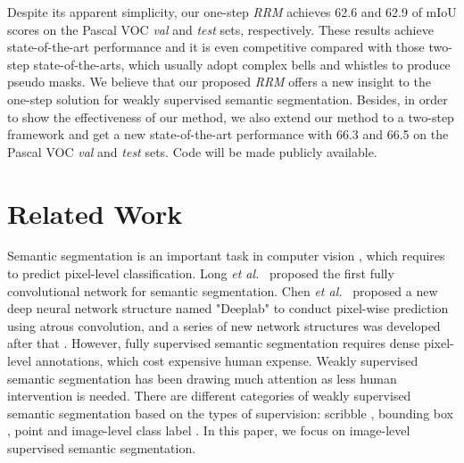 \documentclass[letterpaper]{article} \usepackage{aaai20}  \usepackage{times}  \usepackage{helvet} \usepackage{courier}  \usepackage[hyphens]{url}  \usepackage{graphicx} \urlstyle{rm} \def\UrlFont{\rm}  \usepackage{graphicx}  \frenchspacing  \setlength{\pdfpagewidth}{8.5in}  \setlength{\pdfpageheight}{11in}
\begin{document}
Despite its apparent simplicity, our one-step \emph{RRM} achieves 62.6 and 62.9 of mIoU scores on the Pascal VOC \emph{val} and \emph{test} sets, respectively. These results achieve state-of-the-art performance and it is even competitive compared with those two-step state-of-the-arts, which usually adopt complex bells and whistles to produce pseudo masks. We believe that our proposed \emph{RRM} offers a new insight to the one-step solution for weakly supervised semantic segmentation. Besides, in order to show the effectiveness of our method, we also extend our method to a two-step framework and  get a new state-of-the-art performance with 66.3 and 66.5 on the Pascal VOC \emph{val} and \emph{test} sets. Code will be made publicly available.

\section{Related Work}

Semantic segmentation is an important task in computer vision \cite{wei2018revisiting,xiao2019ian,xie2018correlation}, which requires to predict pixel-level classification.  Long \emph{et al.}~\cite{long2015fully} proposed the first fully convolutional network for semantic segmentation. Chen \emph{et al.}~\cite{chen2014semantic} proposed a new deep neural network structure named "Deeplab" to conduct pixel-wise prediction using atrous convolution, and a series of new network structures was developed after that   \cite{chen2018deeplab,chen2017rethinking,chen2018encoder}. However, fully supervised semantic segmentation requires dense pixel-level annotations, which cost expensive human expense. Weakly supervised semantic segmentation has been drawing much attention as less human intervention is needed. There are different categories of weakly supervised semantic segmentation based on the types of supervision: scribble \cite{tang2018normalized,lin2016scribblesup}, bounding box \cite{song2019box,hu2018learning,rajchl2017deepcut}, point \cite{maninis2018deep,bearman2016s} and image-level class label \cite{zhang2018adversarial,vernaza2017learning,zhang2018self}.
In this paper, we focus on image-level supervised semantic segmentation.
\end{document}
